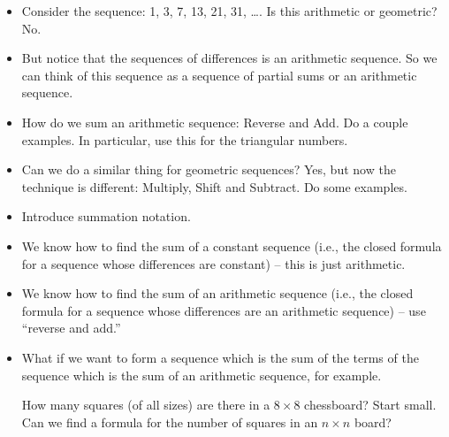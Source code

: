 \documentclass[12pt]{article}
\theoremstyle{plain}
\theoremstyle{definition}
\theoremstyle{remark}
\newcommand{\ex}{\noindent{\bf Ex: }}
\begin{document}
\begin{itemize}
  \item Consider the sequence: 1, 3, 7, 13, 21, 31, \ldots.  Is this arithmetic or geometric?  No.

  \item But notice that the sequences of differences is an arithmetic sequence.  So we can think of this sequence as a sequence of partial sums or an arithmetic sequence.

  \item How do we sum an arithmetic sequence: Reverse and Add.  Do a couple examples.  In particular, use this for the triangular numbers.

  \item Can we do a similar thing for geometric sequences?
  Yes, but now the technique is different: Multiply, Shift and Subtract.  Do some examples.

  \item Introduce summation notation.

 \item We know how to find the sum of a constant sequence (i.e., the closed formula for a sequence whose differences are constant) -- this is just arithmetic.

 \item We know how to find the sum of an arithmetic sequence (i.e., the closed formula for a sequence whose differences are an arithmetic sequence) -- use ``reverse and add.''

 \item What if we want to form a sequence which is the sum of the terms of the sequence which is the sum of an arithmetic sequence, for example.

 \ex How many squares (of all sizes) are there in a $8\times 8$ chessboard?  Start small.  Can we find a formula for the number of squares in an $n\times n$ board?



 \end{itemize}
\end{document}
